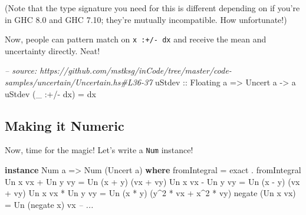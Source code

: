 \documentclass[]{article}
\newenvironment{Shaded}{}{}
\newcommand{\KeywordTok}[1]{\textcolor[rgb]{0.00,0.44,0.13}{\textbf{{#1}}}}
\newcommand{\DataTypeTok}[1]{\textcolor[rgb]{0.56,0.13,0.00}{{#1}}}
\newcommand{\DecValTok}[1]{\textcolor[rgb]{0.25,0.63,0.44}{{#1}}}
\newcommand{\CommentTok}[1]{\textcolor[rgb]{0.38,0.63,0.69}{\textit{{#1}}}}
\newcommand{\OtherTok}[1]{\textcolor[rgb]{0.00,0.44,0.13}{{#1}}}
\newcommand{\FunctionTok}[1]{\textcolor[rgb]{0.02,0.16,0.49}{{#1}}}
\newcommand{\NormalTok}[1]{{#1}}
\begin{document}
(Note that the type signature you need for this is different depending on if
you're in GHC 8.0 and GHC 7.10; they're mutually incompatible. How unfortunate!)

Now, people can pattern match on \texttt{x\ :+/-\ dx} and receive the mean and
uncertainty directly. Neat!

\begin{Shaded}
\begin{Highlighting}[]
\CommentTok{-- source: https://github.com/mstksg/inCode/tree/master/code-samples/uncertain/Uncertain.hs#L36-37}
\OtherTok{uStdev ::} \DataTypeTok{Floating} \NormalTok{a }\OtherTok{=>} \DataTypeTok{Uncert} \NormalTok{a }\OtherTok{->} \NormalTok{a}
\NormalTok{uStdev (_ }\FunctionTok{:+/-} \NormalTok{dx) }\FunctionTok{=} \NormalTok{dx}
\end{Highlighting}
\end{Shaded}

\subsection{Making it Numeric}\label{making-it-numeric}

Now, time for the magic! Let's write a \texttt{Num} instance!

\begin{Shaded}
\begin{Highlighting}[]
\KeywordTok{instance} \DataTypeTok{Num} \NormalTok{a }\OtherTok{=>} \DataTypeTok{Num} \NormalTok{(}\DataTypeTok{Uncert} \NormalTok{a) }\KeywordTok{where}
    \NormalTok{fromIntegral      }\FunctionTok{=} \NormalTok{exact }\FunctionTok{.} \NormalTok{fromIntegral}
    \DataTypeTok{Un} \NormalTok{x vx }\FunctionTok{+} \DataTypeTok{Un} \NormalTok{y vy }\FunctionTok{=} \DataTypeTok{Un} \NormalTok{(x }\FunctionTok{+} \NormalTok{y)    (vx }\FunctionTok{+} \NormalTok{vy)}
    \DataTypeTok{Un} \NormalTok{x vx }\FunctionTok{-} \DataTypeTok{Un} \NormalTok{y vy }\FunctionTok{=} \DataTypeTok{Un} \NormalTok{(x }\FunctionTok{-} \NormalTok{y)    (vx }\FunctionTok{+} \NormalTok{vy)}
    \DataTypeTok{Un} \NormalTok{x vx }\FunctionTok{*} \DataTypeTok{Un} \NormalTok{y vy }\FunctionTok{=} \DataTypeTok{Un} \NormalTok{(x }\FunctionTok{*} \NormalTok{y)    (y}\FunctionTok{^}\DecValTok{2} \FunctionTok{*} \NormalTok{vx }\FunctionTok{+} \NormalTok{x}\FunctionTok{^}\DecValTok{2} \FunctionTok{*} \NormalTok{vy)}
    \NormalTok{negate (}\DataTypeTok{Un} \NormalTok{x vx)  }\FunctionTok{=} \DataTypeTok{Un} \NormalTok{(negate x) vx}
    \CommentTok{-- ...}
\end{Highlighting}
\end{Shaded}
\end{document}

